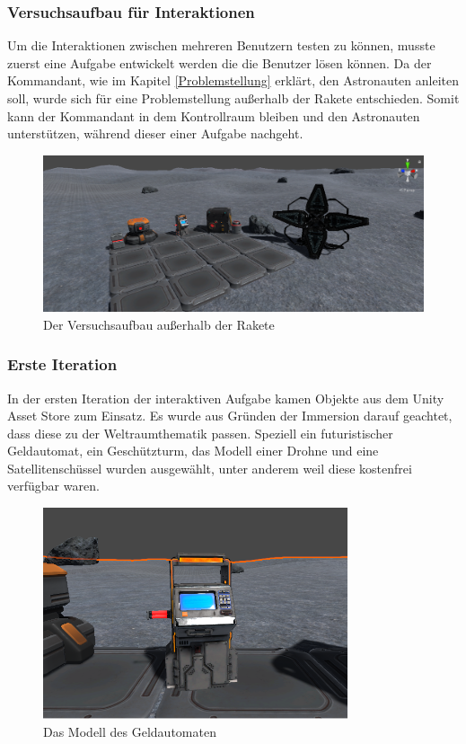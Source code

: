 \subsubsection{Versuchsaufbau für Interaktionen}
Um die Interaktionen zwischen mehreren Benutzern testen zu können, musste zuerst eine Aufgabe entwickelt werden die die Benutzer lösen können. Da der Kommandant, wie im Kapitel \ref{Problemstellung} erklärt, den Astronauten anleiten soll, wurde sich für eine Problemstellung außerhalb der Rakete entschieden. Somit kann der Kommandant in dem Kontrollraum bleiben und den Astronauten unterstützen, während dieser einer Aufgabe nachgeht.

\begin{figure}[H]
\centering
\includegraphics[width=1\textwidth]{InteraktionStation.PNG}
\caption{Der Versuchsaufbau außerhalb der Rakete}
\end{figure}

\subsubsection*{Erste Iteration}
In der ersten Iteration der interaktiven Aufgabe kamen Objekte aus dem Unity Asset Store zum Einsatz. Es wurde aus Gründen der Immersion darauf geachtet, dass diese zu der Weltraumthematik passen. Speziell ein futuristischer Geldautomat, ein Geschützturm, das Modell einer Drohne und eine Satellitenschüssel wurden ausgewählt, unter anderem weil diese kostenfrei verfügbar waren. 

\begin{figure}[H]
\centering
\includegraphics[width=0.8\textwidth]{ATM.PNG}
\caption{Das Modell des Geldautomaten}
\label{fig:ATM}
\end{figure}


